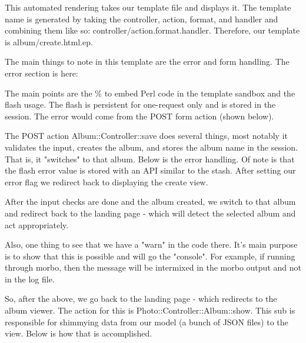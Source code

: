 \documentclass[14pt]{extreport}
\begin{document}
This automated rendering takes our template file and displays it.  The template
name is generated by taking the controller, action, format, and handler and
combining them like so: controller/action.format.handler.  Therefore, our
template is album/create.html.ep.

The main things to note in this template are the error and form handling.  The
error section is here:



The main points are the \% to embed Perl code in the template sandbox and the
flash usage.  The flash is persistent for one-request only and is stored in the
session.  The error would come from the POST form action (shown below).



The POST action Album::Controller::save does several things, most notably it
validates the input, creates the album, and stores the album name in the session. 
That is, it "switches" to that album. Below is the error handling.  Of note is that
the flash error value is stored with an API similar to the stash.  After setting our
error flag we redirect back to displaying the create view.

\clearpage



After the input checks are done and the album created, we switch to that album
and redirect back to the landing page - which will detect the selected album
and act appropriately.



Also, one thing to see that we have a "warn" in the code there. It's main
purpose is to show that this is possible and will go the "console". For
example, if running through morbo, then the message will be intermixed in the 
morbo output and not in the log file.

So, after the above, we go back to the landing page - which redirects to the
album viewer.  The action for this is Photo::Controller::Album::show. This sub
is responsible for shimmying data from our model (a bunch of JSON files) to the
view.  Below is how that is accomplished.
\end{document}
